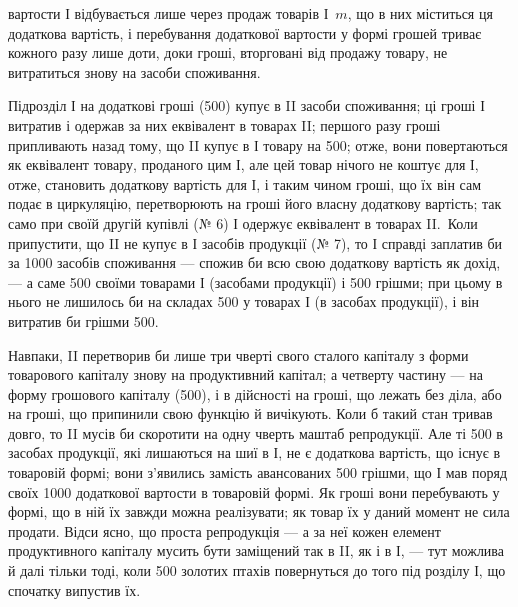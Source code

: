 \parcont{}  %
вартости І відбувається лише через продаж товарів І~$m$, що в них
міститься ця додаткова вартість, і перебування додаткової вартости у
формі грошей триває кожного разу лише доти, доки гроші, вторговані
від продажу товару, не витратиться знову на засоби споживання.

Підрозділ І на додаткові гроші (500) купує в II засоби
споживання; ці гроші І витратив і одержав за них еквівалент в товарах II;
першого разу гроші припливають назад тому, що II купує в І товару
на 500; отже, вони повертаються як еквівалент товару, проданого
цим І, але цей товар нічого не коштує для І, отже, становить додаткову
вартість для І, і таким чином гроші, що їх він сам
подає в циркуляцію, перетворюють на гроші його
власну додаткову вартість; так само при своїй другій купівлі
(№ 6) І одержує еквівалент в товарах II.~Коли припустити, що II не
купує в І засобів продукції (№ 7), то І справді заплатив би за 1000 засобів споживання — спожив би всю свою додаткову вартість як
дохід, — а саме 500 своїми товарами І (засобами продукції) і 500 грішми;
при цьому в нього не лишилось би на складах 500 у товарах І
(в засобах продукції), і він витратив би грішми 500.

Навпаки, II перетворив би лише три чверті свого сталого капіталу
з форми товарового капіталу знову на продуктивний капітал; а четверту
частину — на форму грошового капіталу (500), і в дійсності на
гроші, що лежать без діла, або на гроші, що припинили свою функцію
й вичікують. Коли б такий стан тривав довго, то II мусів би скоротити
на одну чверть маштаб репродукції. Але ті 500 в засобах продукції,
які лишаються на шиї в І, не є додаткова вартість, що існує в товаровій
формі; вони з’явились замість авансованих 500 грішми, що І мав
поряд своїх 1000 додаткової вартости в товаровій формі. Як
гроші вони перебувають у формі, що в ній їх завжди можна реалізувати;
як товар їх у даний момент не сила продати. Відси ясно, що проста
репродукція — а за неї кожен елемент продуктивного капіталу мусить бути
заміщений так в II, як і в І, — тут можлива й далі тільки тоді, коли 500 золотих
птахів повернуться до того під розділу І, що спочатку випустив їх.

